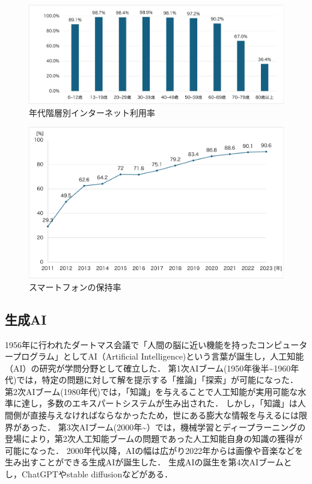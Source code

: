 \documentclass[12pt,a4j,titlepage]{ltjsarticle}
\begin{document}
\begin{figure}[!htb]
  \centering
  \includegraphics[width=15cm]{年代階層別.pdf}
  \caption{年代階層別インターネット利用率}
  \label{fig:nendai}
\end{figure}

\begin{figure}[!htb]
  \centering
  \includegraphics[width=15cm]{スマホ保持率.pdf}
  \caption{スマートフォンの保持率}
  \label{fig:sumaho}
\end{figure}

\clearpage


\subsection{生成AI}

1956年に行われたダートマス会議で「人間の脳に近い機能を持ったコンピュータープログラム」としてAI（Artificial Intelligence)という言葉が誕生し，人工知能（AI）の研究が学問分野として確立した．
第1次AIブーム(1950年後半\textasciitilde1960年代)では，特定の問題に対して解を提示する「推論」「探索」が可能になった．
第2次AIブーム(1980年代)では，「知識」を与えることで人工知能が実用可能な水準に達し，多数のエキスパートシステムが生み出された．
しかし，「知識」は人間側が直接与えなければならなかったため，世にある膨大な情報を与えるには限界があった．
第3次AIブーム(2000年\textasciitilde ）では，機械学習とディープラーニングの登場により，第2次人工知能ブームの問題であった人工知能自身の知識の獲得が可能になった．
2000年代以降，AIの幅は広がり2022年からは画像や音楽などを生み出すことができる生成AIが誕生した．
生成AIの誕生を第4次AIブームとし，ChatGPTやstable diffusionなどがある\cite{somu2016}．
\end{document}
